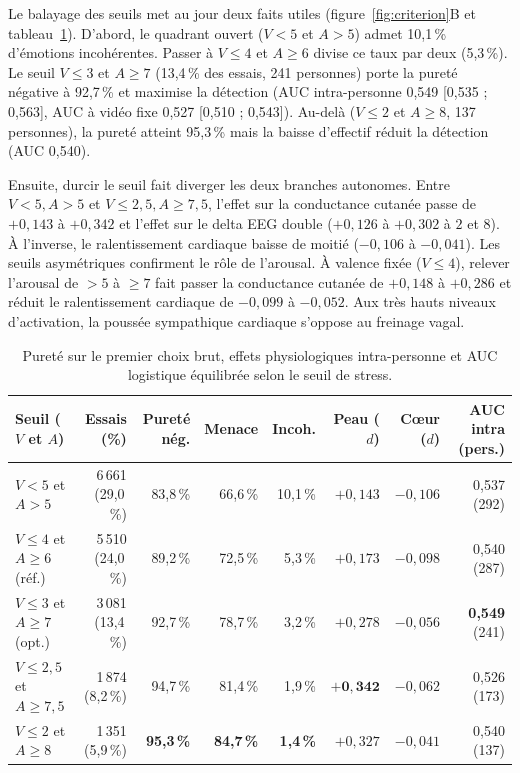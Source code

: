 \documentclass[10pt]{article}
\begin{document}
Le balayage des seuils met au jour deux faits utiles (figure~\ref{fig:criterion}B et tableau~\ref{tab:purification}). D'abord, le quadrant ouvert ($V < 5$ et $A > 5$) admet 10,1\,\% d'émotions incohérentes. Passer à $V \le 4$ et $A \ge 6$ divise ce taux par deux (5,3\,\%). Le seuil $V \le 3$ et $A \ge 7$ (13,4\,\% des essais, 241 personnes) porte la pureté négative à 92,7\,\% et maximise la détection (AUC intra-personne 0,549 [0,535 ; 0,563], AUC à vidéo fixe 0,527 [0,510 ; 0,543]). Au-delà ($V \le 2$ et $A \ge 8$, 137 personnes), la pureté atteint 95,3\,\% mais la baisse d'effectif réduit la détection (AUC 0,540).

Ensuite, durcir le seuil fait diverger les deux branches autonomes. Entre $V < 5, A > 5$ et $V \le 2{,}5, A \ge 7{,}5$, l'effet sur la conductance cutanée passe de $+0{,}143$ à $+0{,}342$ et l'effet sur le delta EEG double ($+0{,}126$ à $+0{,}302$ à $2$ et $8$). À l'inverse, le ralentissement cardiaque baisse de moitié ($-0{,}106$ à $-0{,}041$). Les seuils asymétriques confirment le rôle de l'arousal. À valence fixée ($V \le 4$), relever l'arousal de $>5$ à $\ge 7$ fait passer la conductance cutanée de $+0{,}148$ à $+0{,}286$ et réduit le ralentissement cardiaque de $-0{,}099$ à $-0{,}052$. Aux très hauts niveaux d'activation, la poussée sympathique cardiaque s'oppose au freinage vagal.

\begin{table}[t]
\centering\small
\begin{tabular}{@{}lrrrrrrr@{}}
\toprule
Seuil ($V$ et $A$) & Essais (\%) & Pureté nég. & Menace & Incoh. & Peau ($d$) & Cœur ($d$) & AUC intra (pers.)\\
\midrule
$V < 5$ et $A > 5$ & 6\,661 (29,0\,\%) & 83,8\,\% & 66,6\,\% & 10,1\,\% & $+0{,}143$ & $-0{,}106$ & 0,537 (292)\\
$V \le 4$ et $A \ge 6$ (réf.) & 5\,510 (24,0\,\%) & 89,2\,\% & 72,5\,\% & 5,3\,\% & $+0{,}173$ & $-0{,}098$ & 0,540 (287)\\
$V \le 3$ et $A \ge 7$ (opt.) & 3\,081 (13,4\,\%) & 92,7\,\% & 78,7\,\% & 3,2\,\% & $+0{,}278$ & $-0{,}056$ & \textbf{0,549} (241)\\
$V \le 2{,}5$ et $A \ge 7{,}5$ & 1\,874 (8,2\,\%) & 94,7\,\% & 81,4\,\% & 1,9\,\% & $\mathbf{+0{,}342}$ & $-0{,}062$ & 0,526 (173)\\
$V \le 2$ et $A \ge 8$ & 1\,351 (5,9\,\%) & \textbf{95,3\,\%} & \textbf{84,7\,\%} & \textbf{1,4\,\%} & $+0{,}327$ & $-0{,}041$ & 0,540 (137)\\
\bottomrule
\end{tabular}
\caption{Pureté sur le premier choix brut, effets physiologiques intra-personne et AUC logistique équilibrée selon le seuil de stress.}
\label{tab:purification}
\end{table}
\end{document}
